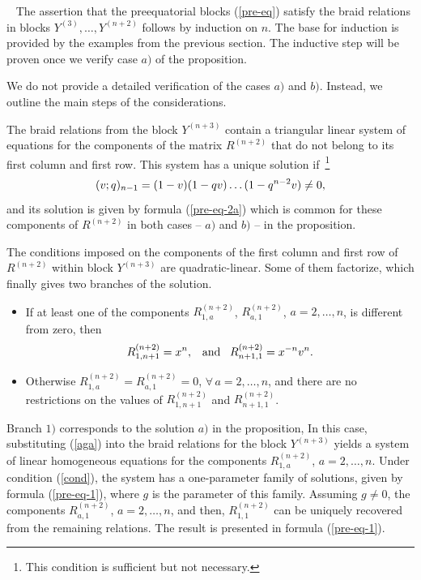 \documentclass[11pt]{article}
\def\be{\begin{equation}}\def\ee{\end{equation}}
\begin{document}
~
The assertion that the preequatorial blocks (\ref{pre-eq}) satisfy the braid relations in blocks $Y^{(3)}, \dots , Y^{(n+2)}$ follows by induction on $n$. The base for induction is provided by the examples from the previous section. The inductive step will be proven once we verify case $a)$ of the proposition.\smallskip

We do not provide a detailed verification of the cases $a)$ and $b)$. Instead, we outline the main steps of the considerations.

The braid relations from the block $Y^{(n+3)}$ contain a triangular linear system of equations for the components of the matrix $R^{(n+2)}$ that do not belong to its first column and first row. This system has a unique solution if~\footnote{This condition is sufficient but not necessary.}
\be
\lb{cond}
(v;q)_{n-1}= (1-v)(1-q v)\dots (1-q^{n-2}v)\neq 0,
\ee
and its solution is given by  formula (\ref{pre-eq-2a}) which is common for these components of $R^{(n+2)}$ in both cases -- $a)$ and $b)$ -- in the proposition.

The conditions imposed on the components of the first column and first row of $R^{(n+2)}$ within block $Y^{(n+3)}$ are quadratic-linear. Some of them factorize, which finally gives two branches of the solution.
\begin{itemize}
	\item[1)] If at least one of the components $R^{(n+2)}_{1,a}$, $ R^{(n+2)}_{a,1}$, $a=2,\dots , n$, is different from zero, then
	\be 
	\lb{aga}
R^{(n+2)}_{1,n+1}=x^n, \;\;\; \mbox{and}\;\;\; R^{(n+2)}_{n+1,1}=x^{-n} v^n.
	\ee 
	\item[2)] Otherwise
	$
	R^{(n+2)}_{1,a}=R^{(n+2)}_{a,1}=0$, $\forall\, a=2,\dots ,n$,
	and there are no restrictions on the values of $R^{(n+2)}_{1,n+1}$ and $R^{(n+2)}_{n+1,1}$.
\end{itemize}

Branch $1)$ corresponds to the solution $a)$ in the proposition, In this case,  substituting (\ref{aga}) into the braid relations for the block $Y^{(n+3)}$ yields a system of linear homogeneous equations for the components $R^{(n+2)}_{1,a}$, $a=2,\dots ,n$. Under condition (\ref{cond}), the system has a one-parameter family of solutions, given by formula (\ref{pre-eq-1}), where $g$ is the parameter of this family. Assuming $g \neq 0$, the components  $R^{(n+2)}_{a,1}$, $a=2,\dots ,n$, and then, $R^{(n+2)}_{1,1}$ can be uniquely recovered from the remaining relations. The result is presented in formula (\ref{pre-eq-1}).
\end{document}
